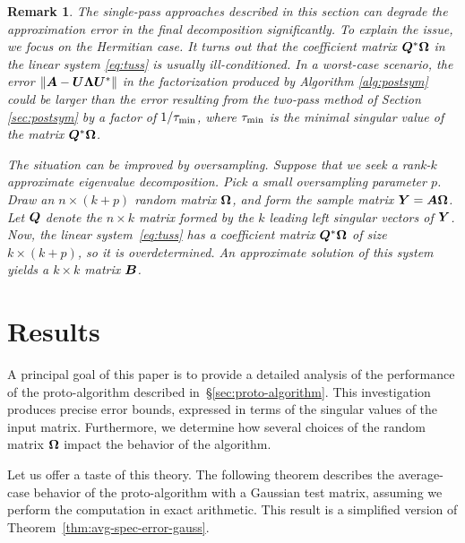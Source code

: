\documentclass{article}
\newtheorem{remark}{Remark}
\begin{document}
\begin{remark} \rm
The single-pass approaches described in this
section can degrade the approximation error
in the final decomposition significantly.
To explain the issue, we focus on
the Hermitian case.  It turns out that the coefficient matrix
$\bm{Q}^{*}\bm{\Omega}$ in the linear
system \eqref{eq:tuss} is usually ill-conditioned.
In a worst-case scenario, the error
$\left\Vert {\bm{A} - \bm{U}\bm{\Lambda}\bm{U}^{*}} \right\Vert$
in the factorization produced by Algorithm \ref{alg:postsym}
could be larger than the error resulting from the two-pass
method of Section \ref{sec:postsym} by a
factor of $1/\tau_{\rm min}$, where $\tau_{\rm min}$ is the
minimal singular value of the matrix $\bm{Q}^{*}\bm{\Omega}$.

The situation can be improved by oversampling.  Suppose that
we seek a rank-$k$ approximate eigenvalue decomposition.
Pick a small oversampling parameter $p$.  Draw
an $n\times (k+p)$ random matrix $\bm{\Omega}$,
and form the sample matrix $\bm{Y} = \bm{A}\bm{\Omega}$.
Let $\bm{Q}$ denote the $n\times k$ matrix formed by
the $k$ leading left singular vectors
of $\bm{Y}$. Now, the linear system~\eqref{eq:tuss} has a coefficient matrix $\bm{Q}^{*}\bm{\Omega}$
of size $k \times (k+p)$, so it is overdetermined.  An
approximate solution of this system yields a $k \times k$
matrix $\bm{B}$.
\end{remark}

\section{Results}

\label{sec:prototheorem} A principal goal of this paper is to
provide a detailed analysis of the performance of the
proto-algorithm described in~\S\ref{sec:proto-algorithm}. This
investigation produces precise error bounds, expressed in terms of
the singular values of the input matrix. Furthermore, we determine
how several choices of the random matrix $\bm{\Omega}$ impact the
behavior of the algorithm.

Let us offer a taste of this theory.  The following theorem
describes the average-case behavior of the proto-algorithm
with a Gaussian test matrix, assuming we perform the computation
in exact arithmetic.  This result is a simplified version of
Theorem~\ref{thm:avg-spec-error-gauss}.

\lsp
\end{document}
